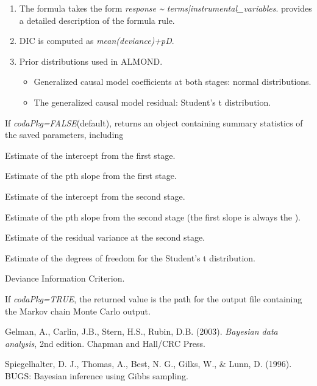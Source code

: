 \documentclass[a4paper]{book}
\begin{document}
\begin{Details}\relax
\begin{enumerate}

\item The formula takes the form \emph{response \textasciitilde{} terms|instrumental\_variables}.
 provides a detailed description of the formula rule.
\item DIC is computed as \emph{mean(deviance)+pD}.
\item Prior distributions used in ALMOND.
\begin{itemize}

\item Generalized causal model coefficients at both stages: normal distributions.
\item The generalized causal model residual: Student's t distribution.

\end{itemize}


\end{enumerate}

\end{Details}
%
\begin{Value}
If \emph{codaPkg=FALSE}(default), returns an object containing summary statistics of
the saved parameters, including
\begin{ldescription}
\item[\code{s1.intercept}] Estimate of the intercept from the first stage.
\item[\code{s1.slopeP}] Estimate of the pth slope from the first stage. 
\item[\code{s2.intercept}] Estimate of the intercept from the second stage.
\item[\code{s2.slopeP}] Estimate of the pth slope from the second stage (the first slope is always
the ).
\item[\code{var.e.s2}] Estimate of the residual variance at the second stage.
\item[\code{df.est}] Estimate of the degrees of freedom for the Student's t distribution.
\item[\code{DIC}] Deviance Information Criterion.
\end{ldescription}
If \emph{codaPkg=TRUE}, the returned value is the path for the output file
containing the Markov chain Monte Carlo output.
\end{Value}
%
\begin{References}\relax
Gelman, A., Carlin, J.B., Stern, H.S., Rubin, D.B. (2003).
\emph{Bayesian data analysis}, 2nd edition. Chapman and Hall/CRC Press.

Spiegelhalter, D. J., Thomas, A., Best, N. G., Gilks, W., \& Lunn, D. (1996).
BUGS: Bayesian inference using Gibbs sampling.
\end{References}
\end{document}
